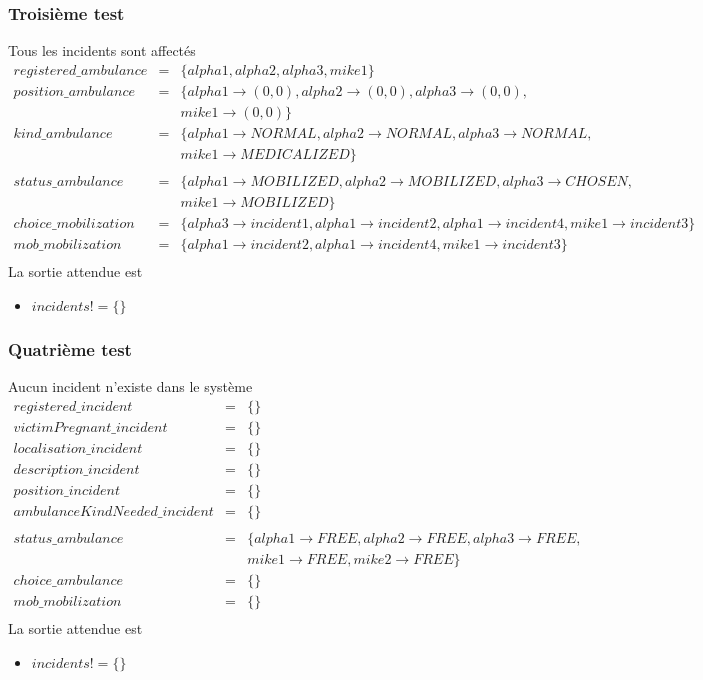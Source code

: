 \documentclass{report}
\begin{document}
\subsubsection{Troisième test}
Tous les incidents sont affectés
\begin{eqnarray*}
registered\_ambulance &=& \{alpha1, alpha2, alpha3, mike1\}\\
position\_ambulance &=& \{alpha1 \rightarrow (0,0), alpha2 \rightarrow (0,0), alpha3 \rightarrow (0,0), \\ 
	&& mike1 \rightarrow (0,0)\}\\
kind\_ambulance &=& \{alpha1 \rightarrow NORMAL, alpha2 \rightarrow NORMAL, alpha3 \rightarrow NORMAL, \\ 
	&& mike1 \rightarrow MEDICALIZED\} \\
\\
status\_ambulance &=& \{alpha1 \rightarrow MOBILIZED, alpha2 \rightarrow MOBILIZED, alpha3 \rightarrow CHOSEN, \\ 
	&& mike1 \rightarrow MOBILIZED\} \\
choice\_mobilization &=& \{alpha3 \rightarrow incident1, alpha1 \rightarrow incident2, alpha1 \rightarrow incident4, mike1 \rightarrow incident3\} \\
mob\_mobilization &=& \{alpha1 \rightarrow incident2, alpha1 \rightarrow incident4, mike1 \rightarrow incident3\} \\
\end{eqnarray*}
La sortie attendue est 
\begin{itemize}
	\item $incidents! = \{\}$
\end{itemize}

\subsubsection{Quatrième test}
Aucun incident n'existe dans le système
\begin{eqnarray*}
registered\_incident &=& \{\}\\
victimPregnant\_incident &=& \{\}\\
localisation\_incident &=& \{\}\\
description\_incident &=& \{\}\\
position\_incident &=& \{\}\\
ambulanceKindNeeded\_incident &=& \{\}\\
\\
status\_ambulance &=& \{alpha1 \rightarrow FREE, alpha2 \rightarrow FREE, alpha3 \rightarrow FREE, \\ 
	&& mike1 \rightarrow FREE, mike2 \rightarrow FREE\} \\
choice\_ambulance &=& \{\} \\
mob\_mobilization &=& \{\} \\
\end{eqnarray*}
La sortie attendue est 
\begin{itemize}
	\item $incidents! = \{\}$
\end{itemize}
\end{document}
